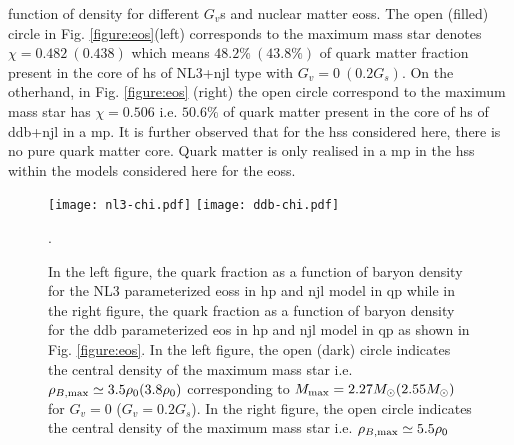 \documentclass[a4paper, 11pt]{article}
\begin{document}
function of density for different $G_v$s and nuclear matter \ac{eos}s. The open (filled) circle in Fig. \ref{figure:eos}(left) 
corresponds to the maximum mass star denotes $\chi=0.482\ (0.438)$ which means $48.2\%\ (43.8\%)$ of quark 
matter fraction present in the core of \ac{hs} of NL3+\ac{njl} type with $G_v=0\ (0.2 G_s)$. On the otherhand,
 in Fig. \ref{figure:eos} (right) the open circle correspond to the maximum mass star has $\chi=0.506$ i.e. $50.6\%$ 
of quark matter present in the core of \ac{hs} of \ac{ddb}+\ac{njl} in a \ac{mp}. It is further observed that 
for the \ac{hs}s considered here, there is no pure quark matter core. Quark matter is only realised in a 
\ac{mp} in the \ac{hs}s within the models considered here for the \ac{eos}s.

\begin{figure}
\centering
\texttt{[image: nl3-chi.pdf]}
\texttt{[image: ddb-chi.pdf]}
\caption{In the left figure, the quark fraction as a function of baryon density for the NL3 parameterized \ac{eos}s in \ac{hp} and \ac{njl} model in \ac{qp} while in the right figure, the quark fraction as a function of baryon density for the \ac{ddb} parameterized \ac{eos} in \ac{hp} and \ac{njl} model in \ac{qp} as shown in Fig. \ref{figure:eos}. In the left figure, the open (dark) circle indicates the central density of the maximum mass star i.e. $\rho_{B,{\rm max}} \simeq 3.5 \rho_0 (3.8 \rho_0)$ corresponding to $M_{\rm max}=2.27 M_{\odot} (2.55 M_{\odot})$ for $G_v=0$ ($G_v=0.2 G_s$). In the right figure, the open circle indicates the central density of the maximum mass star i.e. $\rho_{B,{\rm max}}\simeq 5.5 \rho_{0}$}.
\label{figure:prt-frxn_x}
\end{figure}
\end{document}
